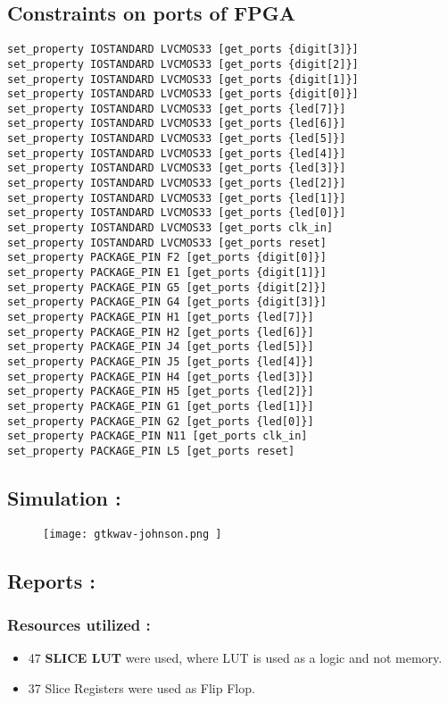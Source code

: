 \subsection*{Constraints on ports of FPGA }
\begin{verbatim}
set_property IOSTANDARD LVCMOS33 [get_ports {digit[3]}]
set_property IOSTANDARD LVCMOS33 [get_ports {digit[2]}]
set_property IOSTANDARD LVCMOS33 [get_ports {digit[1]}]
set_property IOSTANDARD LVCMOS33 [get_ports {digit[0]}]
set_property IOSTANDARD LVCMOS33 [get_ports {led[7]}]
set_property IOSTANDARD LVCMOS33 [get_ports {led[6]}]
set_property IOSTANDARD LVCMOS33 [get_ports {led[5]}]
set_property IOSTANDARD LVCMOS33 [get_ports {led[4]}]
set_property IOSTANDARD LVCMOS33 [get_ports {led[3]}]
set_property IOSTANDARD LVCMOS33 [get_ports {led[2]}]
set_property IOSTANDARD LVCMOS33 [get_ports {led[1]}]
set_property IOSTANDARD LVCMOS33 [get_ports {led[0]}]
set_property IOSTANDARD LVCMOS33 [get_ports clk_in]
set_property IOSTANDARD LVCMOS33 [get_ports reset]
set_property PACKAGE_PIN F2 [get_ports {digit[0]}]
set_property PACKAGE_PIN E1 [get_ports {digit[1]}]
set_property PACKAGE_PIN G5 [get_ports {digit[2]}]
set_property PACKAGE_PIN G4 [get_ports {digit[3]}]
set_property PACKAGE_PIN H1 [get_ports {led[7]}]
set_property PACKAGE_PIN H2 [get_ports {led[6]}]
set_property PACKAGE_PIN J4 [get_ports {led[5]}]
set_property PACKAGE_PIN J5 [get_ports {led[4]}]
set_property PACKAGE_PIN H4 [get_ports {led[3]}]
set_property PACKAGE_PIN H5 [get_ports {led[2]}]
set_property PACKAGE_PIN G1 [get_ports {led[1]}]
set_property PACKAGE_PIN G2 [get_ports {led[0]}]
set_property PACKAGE_PIN N11 [get_ports clk_in]
set_property PACKAGE_PIN L5 [get_ports reset]
\end{verbatim}

\subsection*{Simulation :}
\begin{figure}[H]
    \centering
    \texttt{[image: 
		gtkwav-johnson.png
	]}
\end{figure}

\subsection*{Reports :}
\subsubsection*{Resources utilized : }
\begin{itemize}
    \item 47 \textbf{SLICE LUT} were used, where LUT is used as a logic and not memory.
	\item 37 Slice Registers were used as Flip Flop.
\end{itemize}
